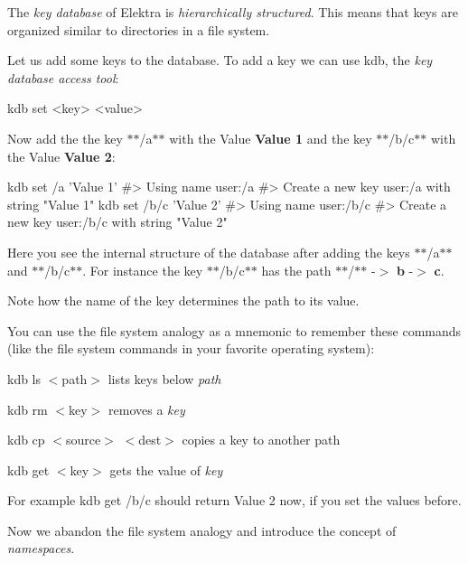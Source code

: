 The {\itshape key database} of Elektra is {\itshape hierarchically structured}. This means that keys are organized similar to directories in a file system.

Let us add some keys to the database. To add a key we can use {\ttfamily kdb}, the {\itshape key database access tool}\+:


\begin{DoxyCode}
kdb set <key> <value>
\end{DoxyCode}


Now add the the key $\ast$$\ast$/a$\ast$$\ast$ with the Value {\bfseries Value 1} and the key $\ast$$\ast$/b/c$\ast$$\ast$ with the Value {\bfseries Value 2}\+:


\begin{DoxyCode}
kdb set /a 'Value 1'
#> Using name user:/a
#> Create a new key user:/a with string "Value 1"
kdb set /b/c 'Value 2'
#> Using name user:/b/c
#> Create a new key user:/b/c with string "Value 2"
\end{DoxyCode}




Here you see the internal structure of the database after adding the keys $\ast$$\ast$/a$\ast$$\ast$ and $\ast$$\ast$/b/c$\ast$$\ast$. For instance the key $\ast$$\ast$/b/c$\ast$$\ast$ has the path $\ast$$\ast$/$\ast$$\ast$ -\/$>$ {\bfseries b} -\/$>$ {\bfseries c}.

Note how the name of the key determines the path to its value.

You can use the file system analogy as a mnemonic to remember these commands (like the file system commands in your favorite operating system)\+:


\begin{DoxyItemize}
\item {\ttfamily kdb ls $<$path$>$} lists keys below {\itshape path}
\item {\ttfamily kdb rm $<$key$>$} removes a {\itshape key}
\item {\ttfamily kdb cp $<$source$>$ $<$dest$>$} copies a key to another path
\item {\ttfamily kdb get $<$key$>$} gets the value of {\itshape key}
\end{DoxyItemize}

For example {\ttfamily kdb get /b/c} should return {\ttfamily Value 2} now, if you set the values before.

Now we abandon the file system analogy and introduce the concept of {\itshape namespaces}.

